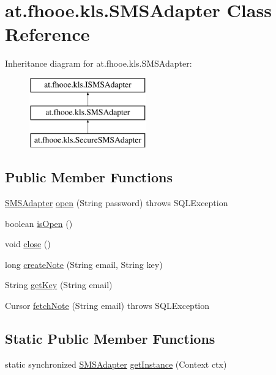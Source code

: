 \hypertarget{classat_1_1fhooe_1_1kls_1_1_s_m_s_adapter}{\section{at.\-fhooe.\-kls.\-S\-M\-S\-Adapter Class Reference}
\label{classat_1_1fhooe_1_1kls_1_1_s_m_s_adapter}
}
Inheritance diagram for at.\-fhooe.\-kls.\-S\-M\-S\-Adapter\-:\begin{figure}[H]
\begin{center}
\leavevmode
\includegraphics[height=3.000000cm]{classat_1_1fhooe_1_1kls_1_1_s_m_s_adapter}
\end{center}
\end{figure}
\subsection*{Public Member Functions}
\begin{DoxyCompactItemize}
\item 
\hyperlink{classat_1_1fhooe_1_1kls_1_1_s_m_s_adapter}{S\-M\-S\-Adapter} \hyperlink{classat_1_1fhooe_1_1kls_1_1_s_m_s_adapter_ace41eadc4ea92f6730039d3ba6d2c396}{open} (String password)  throws S\-Q\-L\-Exception 
\item 
boolean \hyperlink{classat_1_1fhooe_1_1kls_1_1_s_m_s_adapter_a32082acc0bf68a3f8ceeef1314f9911f}{is\-Open} ()
\item 
void \hyperlink{classat_1_1fhooe_1_1kls_1_1_s_m_s_adapter_ad734ff8a56a4191edce7755d59abf36e}{close} ()
\item 
long \hyperlink{classat_1_1fhooe_1_1kls_1_1_s_m_s_adapter_a0a1dbef21c89a477be916368adb4dbd4}{create\-Note} (String email, String key)
\item 
String \hyperlink{classat_1_1fhooe_1_1kls_1_1_s_m_s_adapter_a0107f7e8035be3f23c5eea4f6a2cba5a}{get\-Key} (String email)
\item 
Cursor \hyperlink{classat_1_1fhooe_1_1kls_1_1_s_m_s_adapter_a6bbc52be4af358d45b3be55c347e39fb}{fetch\-Note} (String email)  throws S\-Q\-L\-Exception 
\end{DoxyCompactItemize}
\subsection*{Static Public Member Functions}
\begin{DoxyCompactItemize}
\item 
static synchronized \hyperlink{classat_1_1fhooe_1_1kls_1_1_s_m_s_adapter}{S\-M\-S\-Adapter} \hyperlink{classat_1_1fhooe_1_1kls_1_1_s_m_s_adapter_a8435367d77be7c546935c8fef9fe0131}{get\-Instance} (Context ctx)
\end{DoxyCompactItemize}
